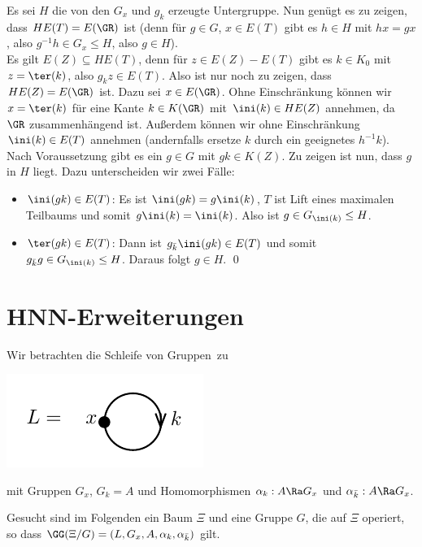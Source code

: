 \bew Es sei $H$ die von den $G_x$ und $g_k$ erzeugte Untergruppe.
Nun genügt es zu zeigen, dass $H E(T)=E(\GR)$ ist (denn für $g\in G$,
$x\in E(T)$ gibt es $h\in H$ mit $hx=gx$, also
$g^{-1}h\in G_x \leq H$, also $g\in H$).\\
Es gilt $E(Z)\subseteq H E(T)$, denn für $z\in E(Z)-E(T)$ gibt es
$k\in K_0$ mit $z=\ter(k)$, also $g_k z \in E(T)$.
Also ist nur noch zu zeigen, dass $HE(Z)=E(\GR)$ ist.
Dazu sei $x\in E(\GR)$. Ohne Einschränkung können wir $x=\ter(k)$
für eine Kante $k\in K(\GR)$ mit $\ini(k)\in HE(Z)$ annehmen,
da $\GR$ zusammenhängend ist. Außerdem können wir ohne Einschränkung
$\ini(k)\in E(T)$ annehmen (andernfalls ersetze $k$ durch ein
geeignetes $h^{-1}k$).
Nach Voraussetzung gibt es ein $g\in G$ mit $gk\in K(Z)$.
Zu zeigen ist nun, dass $g$ in $H$ liegt. Dazu unterscheiden wir
zwei Fälle:
\begin{itemize}
\item
$\ini(gk)\in E(T)$: Es ist $\ini(gk)=g\ini(k)$, $T$ ist Lift eines
maximalen Teilbaums und somit $g\ini(k)=\ini(k)$.
Also ist $g\in G_{\ini(k)}\leq H$.\\
\item
$\ter(gk)\in E(T)$: Dann ist $g_{\bar{k}} \ini(gk)\in E(T)$
und somit $g_{\bar{k}} g \in G_{\ini(k)}\leq H$.
Daraus folgt $g\in H$.
\qed
\end{itemize}


\section{HNN-Erweiterungen}\label{sec_hnn}

Wir betrachten die \glqq Schleife von Gruppen\grqq\ zu
\begin{center}
	\includegraphics{grugraImages/L}
\end{center}
mit Gruppen $G_x$, $G_k=A$ und Homomorphismen
$\alpha_k:A\Ra G_x$ und $\alpha_{\bar{k}}:A\Ra G_x$.

Gesucht sind im Folgenden ein Baum $\Xi$ und eine Gruppe $G$,
die auf $\Xi$ operiert, so dass
$\GG(\Xi/G) = (L,G_x,A,\alpha_k,\alpha_{\bar{k}})$ gilt.

